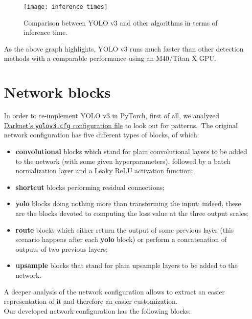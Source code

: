 \documentclass[../report.tex]{subfiles}
\begin{document}
\begin{figure}[H]
	\centering
	\texttt{[image: inference\_times]}
	\caption{Comparison between YOLO v3 and other algorithms in terms of inference time.} \label{fig:inference-time}
\end{figure}
\noindent
As the above graph highlights, YOLO v3 runs much faster than other detection methods with a comparable performance using an M40/Titan X GPU.

\section{Network blocks}\label{s:network-blocks}
In order to re-implement YOLO v3 in PyTorch, first of all, we analyzed \href{https://github.com/pjreddie/darknet/blob/master/cfg/yolov3.cfg}{Darknet's \texttt{yolov3.cfg} configuration file} to look out for patterns.\
The original network configuration has five different types of blocks, of which:
\begin{itemize}
    \item \textbf{convolutional} blocks which stand for plain convolutional layers to be added to the network (with some given hyperparameters), followed by a batch normalization layer and a Leaky ReLU activation function;
    \item \textbf{shortcut} blocks performing residual connections;
    \item \textbf{yolo} blocks doing nothing more than transforming the input: indeed, these are the blocks devoted to computing the loss value at the three output scales;
    \item \textbf{route} blocks which either return the output of some previous layer (this scenario happens after each \textbf{yolo} block) or perform a concatenation of outputs of two previous layers;
    \item \textbf{upsample} blocks that stand for plain upsample layers to be added to the network.
\end{itemize}
A deeper analysis of the network configuration allows to extract an easier representation of it and therefore an easier customization.\\
Our developed network configuration has the following blocks:
\end{document}
